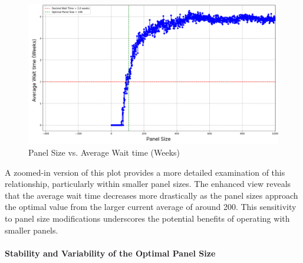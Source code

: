 \documentclass[11pt]{article}
\theoremstyle{definition}
\begin{document}
\begin{figure}[H]
    \centering
    \includegraphics[width=1\textwidth]{sim1run(zoomed).png}
    \caption{Panel Size vs. Average Wait time (Weeks)}
    \label{fig:show_rate}
\end{figure}

A zoomed-in version of this plot provides a more detailed examination of this relationship, particularly within smaller panel sizes. The enhanced view reveals that the average wait time decreases more drastically as the panel sizes approach the optimal value from the larger current average of around 200. This sensitivity to panel size modifications underscores the potential benefits of operating with smaller panels.\\\\
\newpage\textbf{Stability and Variability of the Optimal Panel Size}
\end{document}
